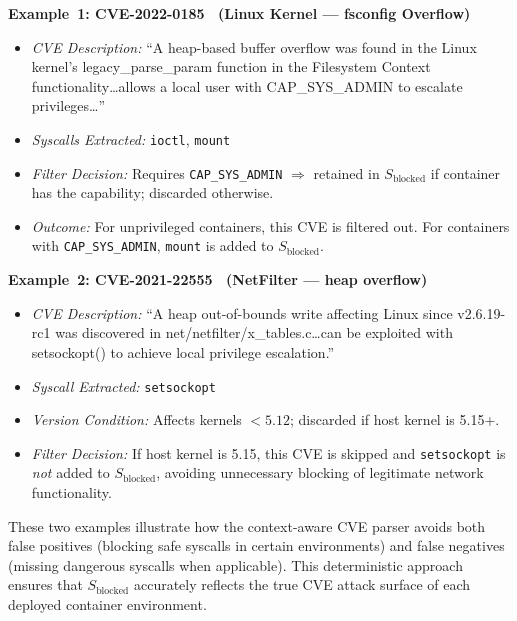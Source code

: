 \textbf{Example~1: CVE-2022-0185~\cite{cve_2022_0185} (Linux Kernel --- fsconfig Overflow)}
\begin{itemize}
  \item \textit{CVE Description:} ``A heap-based buffer overflow was found in the Linux kernel's
        legacy\_parse\_param function in the Filesystem Context functionality\ldots allows a
        local user with CAP\_SYS\_ADMIN to escalate privileges\ldots''
  \item \textit{Syscalls Extracted:} \texttt{ioctl}, \texttt{mount}
  \item \textit{Filter Decision:} Requires \texttt{CAP\_SYS\_ADMIN} $\Rightarrow$ retained in
        $S_{\text{blocked}}$ if container has the capability; discarded otherwise.
  \item \textit{Outcome:} For unprivileged containers, this CVE is filtered out. For containers
        with \texttt{CAP\_SYS\_ADMIN}, \texttt{mount} is added to $S_{\text{blocked}}$.
\end{itemize}

\textbf{Example~2: CVE-2021-22555~\cite{cve_2021_22555} (NetFilter --- heap overflow)}
\begin{itemize}
  \item \textit{CVE Description:} ``A heap out-of-bounds write affecting Linux since
        v2.6.19-rc1 was discovered in net/netfilter/x\_tables.c\ldots can be exploited with
        setsockopt() to achieve local privilege escalation.''
  \item \textit{Syscall Extracted:} \texttt{setsockopt}
  \item \textit{Version Condition:} Affects kernels $< 5.12$; discarded if host kernel is
        5.15+.
  \item \textit{Filter Decision:} If host kernel is 5.15, this CVE is skipped and
        \texttt{setsockopt} is \textit{not} added to $S_{\text{blocked}}$, avoiding unnecessary
        blocking of legitimate network functionality.
\end{itemize}

These two examples illustrate how the context-aware CVE parser avoids both false positives
(blocking safe syscalls in certain environments) and false negatives (missing dangerous syscalls
when applicable). This deterministic approach ensures that $S_{\text{blocked}}$ accurately
reflects the true CVE attack surface of each deployed container environment.
